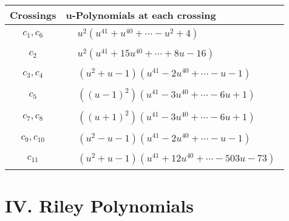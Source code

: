\documentclass[1p]{elsarticle_modified}
\theoremstyle{definition}
\begin{document}
\begin{tabular}{m{50pt}|m{274pt}}
Crossings & \hspace{64pt}u-Polynomials at each crossing \\
\hline $$\begin{aligned}c_{1},c_{6}\end{aligned}$$&$\begin{aligned}
&u^2(u^{41}+u^{40}+\cdots- u^2+4)
\end{aligned}$\\
\hline $$\begin{aligned}c_{2}\end{aligned}$$&$\begin{aligned}
&u^2(u^{41}+15 u^{40}+\cdots+8 u-16)
\end{aligned}$\\
\hline $$\begin{aligned}c_{3},c_{4}\end{aligned}$$&$\begin{aligned}
&(u^2+u-1)(u^{41}-2 u^{40}+\cdots- u-1)
\end{aligned}$\\
\hline $$\begin{aligned}c_{5}\end{aligned}$$&$\begin{aligned}
&((u-1)^2)(u^{41}-3 u^{40}+\cdots-6 u+1)
\end{aligned}$\\
\hline $$\begin{aligned}c_{7},c_{8}\end{aligned}$$&$\begin{aligned}
&((u+1)^2)(u^{41}-3 u^{40}+\cdots-6 u+1)
\end{aligned}$\\
\hline $$\begin{aligned}c_{9},c_{10}\end{aligned}$$&$\begin{aligned}
&(u^2- u-1)(u^{41}-2 u^{40}+\cdots- u-1)
\end{aligned}$\\
\hline $$\begin{aligned}c_{11}\end{aligned}$$&$\begin{aligned}
&(u^2+u-1)(u^{41}+12 u^{40}+\cdots-503 u-73)
\end{aligned}$\\
\hline
\end{tabular}\newpage\renewcommand{\arraystretch}{1}
\centering \section*{ IV. Riley Polynomials}
\end{document}
